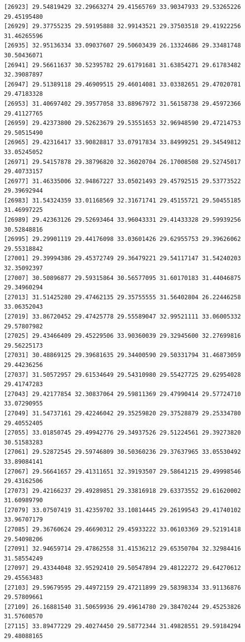 \documentclass[
  letterpaper,
  DIV=11,
  numbers=noendperiod]{scrartcl}
\begin{document}
\begin{verbatim}
[26923] 29.54819429 32.29663274 29.41565769 33.90347933 29.53265226 29.45195480
[26929] 29.37755235 29.59195888 32.99143521 29.37503518 29.41922256 31.46265596
[26935] 32.95136334 33.09037607 29.50603439 26.13324686 29.33481748 30.50436071
[26941] 29.56611637 30.52395782 29.61791681 31.63854271 29.61783482 32.39087897
[26947] 29.51389118 29.46909515 29.46014081 33.03382651 29.47020781 29.47183328
[26953] 31.40697402 29.39577058 33.88967972 31.56158738 29.45972366 29.41127765
[26959] 29.42373800 29.52623679 29.53551653 32.96948590 29.47214753 29.50515490
[26965] 29.42316417 33.90828817 33.07917834 33.84999251 29.34549812 33.05245052
[26971] 29.54157878 29.38796820 32.36020704 26.17008508 29.52745017 29.40733157
[26977] 31.46335006 32.94867227 33.05021493 29.45792515 29.53773522 29.39692944
[26983] 31.54324359 33.01168569 32.31671741 29.45155721 29.50455185 31.46997225
[26989] 29.42363126 29.52693464 33.96043331 29.41433328 29.59939256 30.52848816
[26995] 29.29901119 29.44176098 33.03601426 29.62955753 29.39626062 29.55318842
[27001] 29.39994386 29.45372749 29.36479221 29.54117147 31.54240203 32.35092397
[27007] 30.50896877 29.59315864 30.56577095 31.60170183 31.44046875 29.34960294
[27013] 31.51425280 29.47462135 29.35755555 31.56402804 26.22446258 33.06352043
[27019] 33.86720452 29.47425778 29.55589047 32.99521111 33.06005332 29.57807982
[27025] 29.43466409 29.45229506 33.90360039 29.32945600 32.27699816 29.56225173
[27031] 30.48869125 29.39681635 29.34400590 29.50331794 31.46873059 29.44236256
[27037] 31.50572957 29.61534649 29.54310980 29.55427725 29.62954028 29.41747283
[27043] 29.42177854 32.30837064 29.59811369 29.47990414 29.57724710 33.07290955
[27049] 31.54737161 29.42246042 29.35259820 29.37528879 29.25334780 29.40552405
[27055] 33.01850745 29.49942776 29.34937526 29.51224561 29.39273820 30.51583283
[27061] 29.52872545 29.59746809 30.50360236 29.37637965 33.05530492 33.89084141
[27067] 29.56641657 29.41311651 32.39193507 29.58641215 29.49998546 29.43162506
[27073] 29.42166237 29.49289851 29.33816918 29.63373552 29.61620002 31.60989790
[27079] 33.07507419 31.42359702 33.10814445 29.26199543 29.41740102 33.96707179
[27085] 29.36760624 29.46690312 29.45933222 33.06103369 29.52191418 29.54098206
[27091] 32.94659714 29.47862558 31.41536212 29.65350704 32.32984416 31.58554249
[27097] 29.43344048 32.95292410 29.50547894 29.48122272 29.64270612 29.45563483
[27103] 29.59679595 29.44972159 29.47211899 29.58398334 33.91136876 29.57809661
[27109] 26.16881540 31.50659936 29.49614780 29.38470244 29.45253826 31.57608570
[27115] 33.89477229 29.40274450 29.58772344 31.49828551 29.59184294 29.48088165

\end{verbatim}
\end{document}
